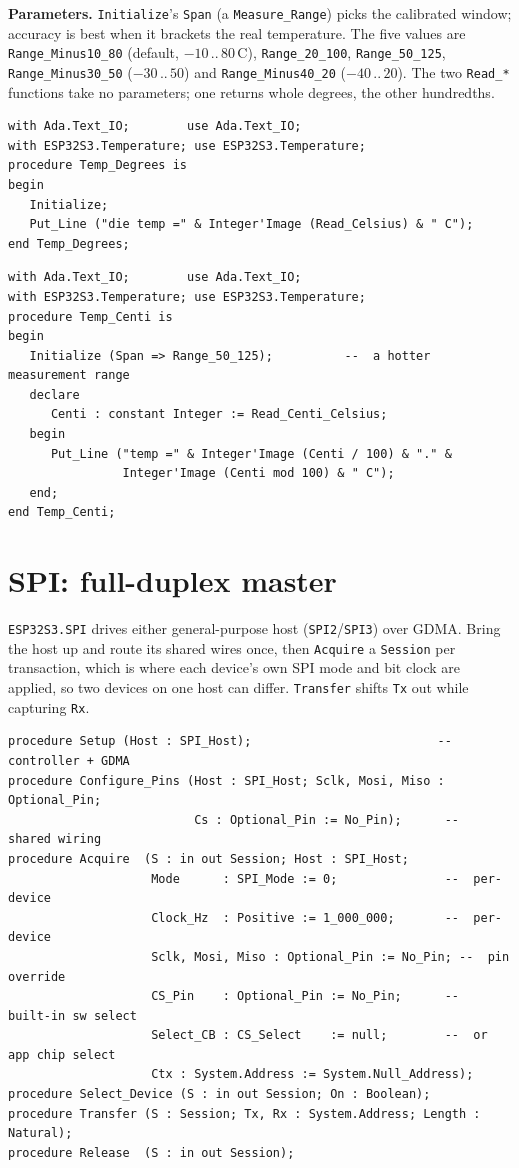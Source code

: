 \textbf{Parameters.} \texttt{Initialize}'s \texttt{Span} (a \texttt{Measure\_Range})
picks the calibrated window; accuracy is best when it brackets the real
temperature. The five values are \texttt{Range\_Minus10\_80} (default, $-10\,..\,80$\,\textdegree C),
\texttt{Range\_20\_100}, \texttt{Range\_50\_125}, \texttt{Range\_Minus30\_50}
($-30\,..\,50$) and \texttt{Range\_Minus40\_20} ($-40\,..\,20$). The two
\texttt{Read\_*} functions take no parameters; one returns whole degrees, the
other hundredths.

\begin{lstlisting}
with Ada.Text_IO;        use Ada.Text_IO;
with ESP32S3.Temperature; use ESP32S3.Temperature;
procedure Temp_Degrees is
begin
   Initialize;
   Put_Line ("die temp =" & Integer'Image (Read_Celsius) & " C");
end Temp_Degrees;
\end{lstlisting}

\begin{lstlisting}
with Ada.Text_IO;        use Ada.Text_IO;
with ESP32S3.Temperature; use ESP32S3.Temperature;
procedure Temp_Centi is
begin
   Initialize (Span => Range_50_125);          --  a hotter measurement range
   declare
      Centi : constant Integer := Read_Centi_Celsius;
   begin
      Put_Line ("temp =" & Integer'Image (Centi / 100) & "." &
                Integer'Image (Centi mod 100) & " C");
   end;
end Temp_Centi;
\end{lstlisting}

\section{SPI: full-duplex master}

\texttt{ESP32S3.SPI} drives either general-purpose host (\texttt{SPI2}/\texttt{SPI3})
over GDMA. Bring the host up and route its shared wires once, then \texttt{Acquire}
a \texttt{Session} per transaction, which is where each device's own SPI mode and
bit clock are applied, so two devices on one host can differ. \texttt{Transfer}
shifts \texttt{Tx} out while capturing \texttt{Rx}.

\begin{lstlisting}
procedure Setup (Host : SPI_Host);                          --  controller + GDMA
procedure Configure_Pins (Host : SPI_Host; Sclk, Mosi, Miso : Optional_Pin;
                          Cs : Optional_Pin := No_Pin);      --  shared wiring
procedure Acquire  (S : in out Session; Host : SPI_Host;
                    Mode      : SPI_Mode := 0;               --  per-device
                    Clock_Hz  : Positive := 1_000_000;       --  per-device
                    Sclk, Mosi, Miso : Optional_Pin := No_Pin; --  pin override
                    CS_Pin    : Optional_Pin := No_Pin;      --  built-in sw select
                    Select_CB : CS_Select    := null;        --  or app chip select
                    Ctx : System.Address := System.Null_Address);
procedure Select_Device (S : in out Session; On : Boolean);
procedure Transfer (S : Session; Tx, Rx : System.Address; Length : Natural);
procedure Release  (S : in out Session);
\end{lstlisting}

